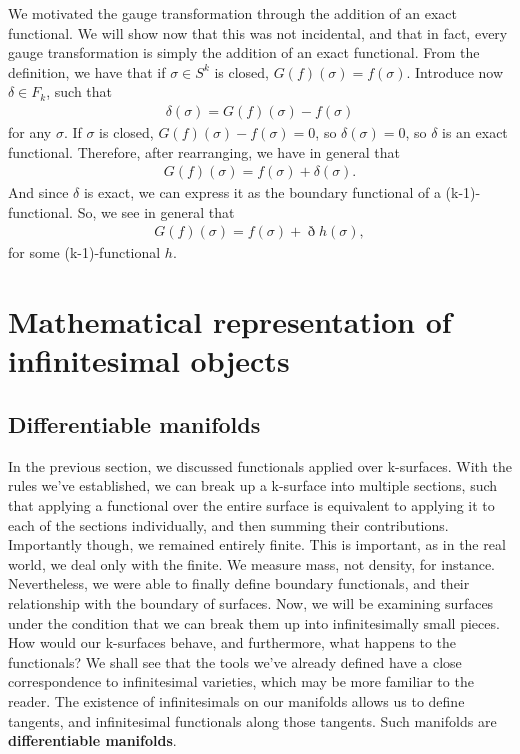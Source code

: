 \documentclass{book}
\begin{document}
We motivated the gauge transformation through the addition of an exact functional. We will show now that this was not incidental, and that in fact, every gauge transformation is simply the addition of an exact functional. From the definition, we have that if $\sigma \in S^k$ is closed, $G(f)(\sigma) = f(\sigma)$. Introduce now $\delta \in F_k$, such that \begin{gather} \delta(\sigma) = G(f)(\sigma) - f(\sigma) \end{gather} for any $\sigma$. If $\sigma$ is closed, $G(f)(\sigma) - f(\sigma) = 0$, so $\delta(\sigma) = 0$, so $\delta$ is an exact functional. Therefore, after rearranging, we have in general that \begin{gather} G(f)(\sigma) = f(\sigma) + \delta(\sigma). \end{gather} And since $\delta$ is exact, we can express it as the boundary functional of a (k-1)-functional. So, we see in general that \begin{gather} G(f)(\sigma) = f(\sigma) + \eth h(\sigma), \end{gather} for some (k-1)-functional $h$. 

\chapter{Mathematical representation of infinitesimal objects}



\section{Differentiable manifolds}



In the previous section, we discussed functionals applied over k-surfaces. With the rules we've established, we can break up a k-surface into multiple sections, such that applying a functional over the entire surface is equivalent to applying it to each of the sections individually, and then summing their contributions. Importantly though, we remained entirely finite. This is important, as in the real world, we deal only with the finite. We measure mass, not density, for instance. Nevertheless, we were able to finally define boundary functionals, and their relationship with the boundary of surfaces. Now, we will be examining surfaces under the condition that we can break them up into infinitesimally small pieces. How would our k-surfaces behave, and furthermore, what happens to the functionals? We shall see that the tools we've already defined have a close correspondence to infinitesimal varieties, which may be more familiar to the reader. The existence of infinitesimals on our manifolds allows us to define tangents, and infinitesimal functionals along those tangents. Such manifolds are \textbf{differentiable manifolds}. 
\end{document}

